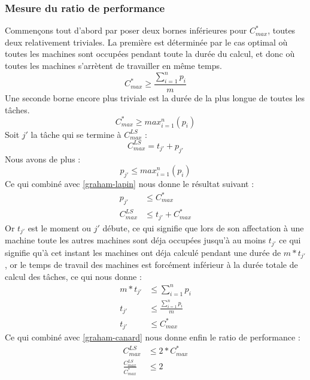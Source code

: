 \subsubsection{Mesure du ratio de performance}
Commençons tout d'abord par poser deux bornes inférieures pour $C^*_{max}$, 
toutes deux relativement triviales. La première est déterminée par le cas 
optimal où toutes les machines sont occupées pendant toute la durée du calcul, 
et donc où toutes les machines s'arrètent de travailler en même temps.
\begin{equation}
\label{graham-chien}
C^*_{max} \geq \frac{\sum_{i=1}^n p_{i}}{m}
\end{equation}
Une seconde borne encore plus triviale est la durée de la plus longue de toutes 
les tâches.
\begin{equation}
\label{graham-lapin}
C^*_{max} \geq max^n_{i=1}(p_{i})
\end{equation}
Soit $j'$ la tâche qui se termine à $C^{LS}_{max}$ :
\begin{equation}
C^{LS}_{max} = t_{j'} + p_{j'}
\end{equation}
Nous avons de plus :
\begin{equation}
p_{j'} \leq max^n_{i=1}(p_{i})
\end{equation}
Ce qui combiné avec \eqref{graham-lapin} nous donne le résultat suivant :
\begin{align}
p_{j'} &\leq C^*_{max} \\
\label{graham-canard}
C^{LS}_{max} &\leq t_{j'} + C^*_{max}
\end{align}
Or $t_{j'}$ est le moment ou $j'$ débute, ce qui signifie que lors de son 
affectation à une machine toute les autres machines sont déja occupées jusqu'à 
au moins $t_{j'}$ ce qui signifie qu'à cet instant les machines ont déja calculé 
pendant une durée de $m*t_{j'}$, or le temps de travail des machines est 
forcément inférieur à la durée totale de calcul des tâches, ce qui nous donne :
\begin{align}
m*t_{j'} &\leq \sum_{i=1}^n p_{i} \\
\label{graham-ours}
t_{j'} &\leq \frac{\sum_{i=1}^n p_{i}}{m} \\
t_{j'} &\leq C^*_{max}
\end{align}
Ce qui combiné avec \eqref{graham-canard} nous donne enfin le ratio de 
performance :
\begin{align}
C^{LS}_{max} &\leq 2*C^*_{max} \\
\frac{C^{LS}_{max}}{C^*_{max}} &\leq 2 
\end{align}

